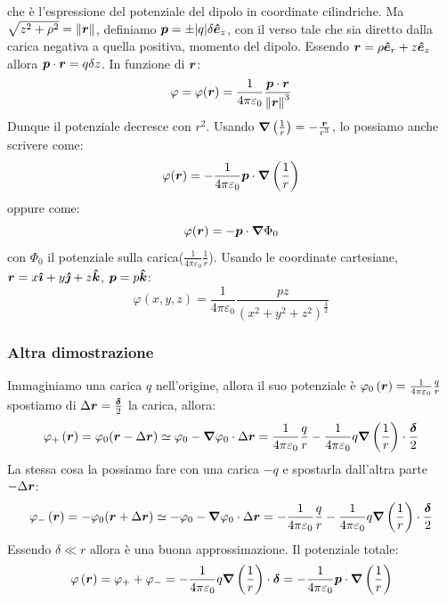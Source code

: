 che è l'espressione del potenziale del dipolo in coordinate cilindriche. Ma $\sqrt{z^2+\rho^2}=\left\lVert\boldsymbol{r}\right\rVert$, definiamo $\boldsymbol{p}=\pm |q|\delta \boldsymbol{\hat {e}}_z$, con il verso tale che sia diretto dalla carica negativa a quella positiva, momento del dipolo. Essendo $\boldsymbol{r}=\rho\boldsymbol{\hat {e}}_r+z\boldsymbol{\hat {e}}_z$ allora $\boldsymbol{p}\cdot\boldsymbol{r}=q\delta z$. In funzione di $\boldsymbol{r}$:
\[\varphi=\varphi(\boldsymbol{r})=\frac{1}{4\pi\varepsilon_0}\frac{\boldsymbol{p}\cdot\boldsymbol{r}}{{\left\lVert\boldsymbol{r}\right\rVert}^3}\]
Dunque il potenziale decresce con $r^2$. Usando $\boldsymbol{\nabla}\left(\frac{1}{r}\right)=-\frac{\boldsymbol{r}}{r^3}$, lo possiamo anche scrivere come:
\begin{equation}
  \varphi(\boldsymbol{r})=-\frac{1}{4\pi\varepsilon_0}\boldsymbol{p}\cdot\boldsymbol{\nabla}\left(\frac{1}{r}\right)
\end{equation}
oppure come:
\begin{equation}
  \varphi(\boldsymbol{r})=-\boldsymbol{p}\cdot\boldsymbol{\nabla}\Phi_0
\end{equation}
con $\Phi_0$ il potenziale sulla carica($\frac{1}{4\pi\varepsilon_0}\frac{1}{r}$). Usando le coordinate cartesiane, $\boldsymbol{r}=x\boldsymbol{\hat {\imath}}+y\boldsymbol{\hat {\jmath}}+z\boldsymbol{\hat {k}}$, $\boldsymbol{p}=p\boldsymbol{\hat {k}}$:
\begin{equation}
  \varphi(x,y,z)=\frac{1}{4\pi\varepsilon_0}\frac{pz}{\left(x^2+y^2+z^2\right)^\frac{3}{2}}
\end{equation}
\subsubsection{Altra dimostrazione}
Immaginiamo una carica $q$ nell'origine, allora il suo potenziale è $\varphi_0\left(\boldsymbol{r}\right)=\frac{1}{4\pi\varepsilon_0}\frac{q}{r}$
spostiamo di $\Delta\boldsymbol{r}=\frac{\boldsymbol{\delta}}{2}$ la carica, allora:
\[\varphi_+\left(\boldsymbol{r}\right)=\varphi_0(\boldsymbol{r}-\Delta \boldsymbol{r})\simeq\varphi_0-\boldsymbol{\nabla}\varphi_0\cdot\Delta\boldsymbol{r}=\frac{1}{4\pi\varepsilon_0}\frac{q}{r}-\frac{1}{4\pi\varepsilon_0}q\boldsymbol{\nabla}\left(\frac{1}{r}\right)\cdot\frac{\boldsymbol{\delta}}{2}\]
La stessa cosa la possiamo fare con una carica $-q$ e spostarla dall'altra parte $-\Delta\boldsymbol{r}$:
\[\varphi_-\left(\boldsymbol{r}\right)=-\varphi_0(\boldsymbol{r}+\Delta \boldsymbol{r})\simeq-\varphi_0-\boldsymbol{\nabla}\varphi_0\cdot\Delta\boldsymbol{r}=-\frac{1}{4\pi\varepsilon_0}\frac{q}{r}-\frac{1}{4\pi\varepsilon_0}q\boldsymbol{\nabla}\left(\frac{1}{r}\right)\cdot\frac{\boldsymbol{\delta}}{2}\]
Essendo $\delta\ll r$ allora è una buona approssimazione. Il potenziale totale:
\[\varphi\left(\boldsymbol{r}\right)=\varphi_++\varphi_-=-\frac{1}{4\pi\varepsilon_0}q\boldsymbol{\nabla}\left(\frac{1}{r}\right)\cdot\boldsymbol{\delta}=-\frac{1}{4\pi\varepsilon_0}\boldsymbol{p}\cdot\boldsymbol{\nabla}\left(\frac{1}{r}\right)\]


